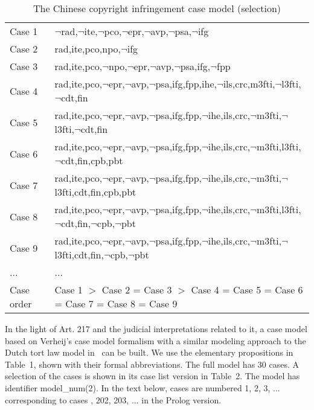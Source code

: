 \documentclass{IOS-Book-Article}
\begin{document}
\begin{table}[b]
	\tiny
	\caption{The Chinese copyright infringement case model (selection)}
	\label{tab:long}
	\begin{tabularx}{\textwidth}{p{1.2cm}|p{10cm}}
		\hline
		Case 1 & $\neg$rad,$\neg$ite,$\neg$pco,$\neg$epr,$\neg$avp,$\neg$psa,$\neg$ifg\\
		Case 2 & rad,ite,pco,npo,$\neg$ifg\\
		Case 3 & rad,ite,pco,$\neg$npo,$\neg$epr,$\neg$avp,$\neg$psa,ifg,$\neg$fpp\\
		Case 4 & rad,ite,pco,$\neg$epr,$\neg$avp,$\neg$psa,ifg,fpp,ihe,$\neg$ils,crc,m3fti,$\neg$l3fti,$\neg$cdt,fin\\
		Case 5 & rad,ite,pco,$\neg$epr,$\neg$avp,$\neg$psa,ifg,fpp,$\neg$ihe,ils,crc,$\neg$m3fti,$\neg$l3fti,$\neg$cdt,fin\\
		Case 6 & rad,ite,pco,$\neg$epr,$\neg$avp,$\neg$psa,ifg,fpp,$\neg$ihe,ils,crc,$\neg$m3fti,l3fti,$\neg$cdt,fin,cpb,pbt\\
		Case 7 & rad,ite,pco,$\neg$epr,$\neg$avp,$\neg$psa,ifg,fpp,$\neg$ihe,ils,crc,$\neg$m3fti,$\neg$l3fti,cdt,fin,cpb,pbt\\
		Case 8 & rad,ite,pco,$\neg$epr,$\neg$avp,$\neg$psa,ifg,fpp,$\neg$ihe,ils,crc,$\neg$m3fti,l3fti,$\neg$cdt,fin,$\neg$cpb,$\neg$pbt\\
		Case 9 & rad,ite,pco,$\neg$epr,$\neg$avp,$\neg$psa,ifg,fpp,$\neg$ihe,ils,crc,$\neg$m3fti,$\neg$l3fti,cdt,fin,$\neg$cpb,$\neg$pbt\\					... & ...\\
		\hline
	Case order & Case 1 $>$ Case 2 = Case 3 $>$ Case 4 = Case 5 = Case 6 = Case 7 = Case 8 = Case 9\\
	\hline
	\end{tabularx}
\end{table}

\normalsize

In the light of Art. 217 and the judicial interpretations related to it, a case model based on Verheij's case model formalism with a similar modeling approach to the Dutch tort law model in~\cite{Verheij2017Formalizing} can be built. We use the elementary propositions in Table~1, shown with their formal abbreviations. 
The full model has 30 cases. A selection of the cases is shown in its case list version in Table~2. The model has identifier {\mf model\_num(2)}. 
In the text below, cases are numbered 1, 2, 3, ... corresponding  to cases {, 202, 203, ...} in the Prolog version.

\normalsize
\end{document}

